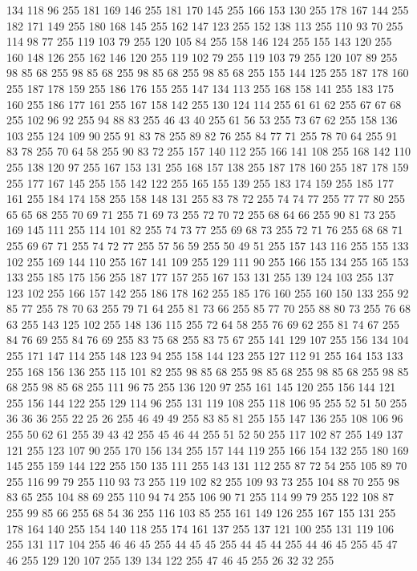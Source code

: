 134 118 96 255 181 169 146 255 181 170 145 255 166 153 130 255 178 167 144 255 182 171 149 255 180 168 145 255 162 147 123 255 152 138 113 255 110 93 70 255 114 98 77 255 119 103 79 255 120 105 84 255 158 146 124 255 155 143 120 255 160 148 126 255 162 146 120 255 119 102 79 255 119 103 79 255 120 107 89 255 98 85 68 255 98 85 68 255 98 85 68 255 98 85 68 255 155 144 125 255 187 178 160 255 187 178 159 255 186 176 155 255 147 134 113 255 168 158 141 255 183 175 160 255 186 177 161 255 167 158 142 255 130 124 114 255 61 61 62 255 67 67 68 255 102 96 92 255 94 88 83 255 46 43 40 255 61 56 53 255 73 67 62 255 158 136 103 255 124 109 90 255 91 83 78 255 89 82 76 255 84 77 71 255 78 70 64 255 91 83 78 255 70 64 58 255 90 83 72 255 157 140 112 255 166 141 108 255 168 142 110 255 138 120 97 255 167 153 131 255 168 157 138 255 187 178 160 255 187 178 159 255 177 167 145 255 155 142 122 255 165 155 139 255 183 174 159 255 185 177 161 255 184 174 158 255
158 148 131 255 83 78 72 255 74 74 77 255 77 77 80 255 65 65 68 255 70 69 71 255 71 69 73 255 72 70 72 255 68 64 66 255 90 81 73 255 169 145 111 255 114 101 82 255 74 73 77 255 69 68 73 255 72 71 76 255 68 68 71 255 69 67 71 255 74 72 77 255 57 56 59 255 50 49 51 255 157 143 116 255 155 133 102 255 169 144 110 255 167 141 109 255 129 111 90 255 166 155 134 255 165 153 133 255 185 175 156 255 187 177 157 255 167 153 131 255 139 124 103 255 137 123 102 255 166 157 142 255 186 178 162 255 185 176 160 255 160 150 133 255 92 85 77 255 78 70 63 255 79 71 64 255 81 73 66 255 85 77 70 255 88 80 73 255 76 68 63 255 143 125 102 255 148 136 115 255 72 64 58 255 76 69 62 255 81 74 67 255 84 76 69 255 84 76 69 255 83 75 68 255 83 75 67 255 141 129 107 255 156 134 104 255 171 147 114 255 148 123 94 255 158 144 123 255 127 112 91 255 164 153 133 255 168 156 136 255 115 101 82 255 98 85 68 255 98 85 68 255 98 85 68 255
98 85 68 255 98 85 68 255 111 96 75 255 136 120 97 255 161 145 120 255 156 144 121 255 156 144 122 255 129 114 96 255 131 119 108 255 118 106 95 255 52 51 50 255 36 36 36 255 22 25 26 255 46 49 49 255 83 85 81 255 155 147 136 255 108 106 96 255 50 62 61 255 39 43 42 255 45 46 44 255 51 52 50 255 117 102 87 255 149 137 121 255 123 107 90 255 170 156 134 255 157 144 119 255 166 154 132 255 180 169 145 255 159 144 122 255 150 135 111 255 143 131 112 255 87 72 54 255 105 89 70 255 116 99 79 255 110 93 73 255 119 102 82 255 109 93 73 255 104 88 70 255 98 83 65 255 104 88 69 255 110 94 74 255 106 90 71 255 114 99 79 255 122 108 87 255 99 85 66 255 68 54 36 255 116 103 85 255 161 149 126 255 167 155 131 255 178 164 140 255 154 140 118 255 174 161 137 255 137 121 100 255 131 119 106 255 131 117 104 255 46 46 45 255 44 45 45 255 44 45 44 255 44 46 45 255 45 47 46 255 129 120 107 255 139 134 122 255 47 46 45 255 26 32 32 255
